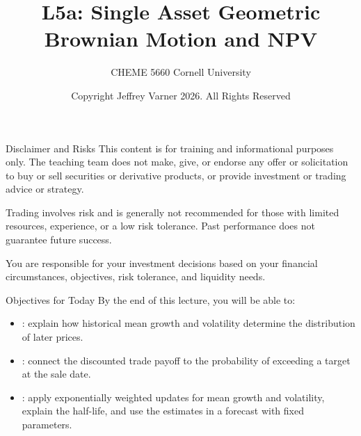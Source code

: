 \documentclass[aspectratio=169,11pt]{beamer}
\title{\texorpdfstring{{\vnheavy L5a}}{L5a}: Single Asset Geometric Brownian Motion and NPV}
\subtitle{CHEME 5660 Cornell University}
\author{Copyright Jeffrey Varner 2026. All Rights Reserved}
\begin{document}
\vntitlepage
\begin{frame}{Disclaimer and Risks}
  \vspace{0.6em}
  \textbf{} This content is for training and informational
  purposes only. The teaching team does not make, give, or endorse any offer or
  solicitation to buy or sell securities or derivative products, or provide
  investment or trading advice or strategy.

  \vspace{1.1em}
  \textbf{} Trading involves risk and is generally not recommended for
  those with limited resources, experience, or a low risk tolerance. Past
  performance does not guarantee future success.

  \vspace{1.1em}
  \textbf{} You are responsible for your investment decisions
  based on your financial circumstances, objectives, risk tolerance, and
  liquidity needs.
\end{frame}

\begin{frame}{Objectives for Today}
By the end of this lecture, you will be able to:
\vspace{0.8em}
\begin{itemize}\setlength{\itemsep}{0.8em}
\item {}: explain how historical
mean growth and volatility determine the distribution of later prices.
\item {}: connect the discounted
trade payoff to the probability of exceeding a target at the sale date.
\item {}: apply exponentially weighted
updates for mean growth and volatility, explain the half-life, and use the
estimates in a forecast with fixed parameters.
\end{itemize}
\end{frame}
\end{document}

